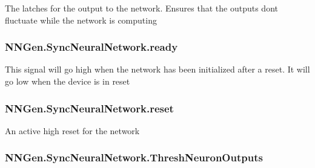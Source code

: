 The latches for the output to the network. Ensures that the outputs don\textquotesingle{}t fluctuate while the network is computing 

\hypertarget{class_n_n_gen_1_1_sync_neural_network_a6306a2d9e689ed32c74ccc5222284315}{}
\subsubsection[{ready}]{ N\+N\+Gen.\+Sync\+Neural\+Network.\+ready\hspace{0.3cm}{\ttfamily [get]}}\label{class_n_n_gen_1_1_sync_neural_network_a6306a2d9e689ed32c74ccc5222284315}


This signal will go high when the network has been initialized after a reset. It will go low when the device is in reset 

\hypertarget{class_n_n_gen_1_1_sync_neural_network_a6479fe503fb64dead6508c80c773b042}{}
\subsubsection[{reset}]{ N\+N\+Gen.\+Sync\+Neural\+Network.\+reset\hspace{0.3cm}{\ttfamily [get]}}\label{class_n_n_gen_1_1_sync_neural_network_a6479fe503fb64dead6508c80c773b042}


An active high reset for the network 

\hypertarget{class_n_n_gen_1_1_sync_neural_network_a6edeb1a10c731dbc74be6e227201deb0}{}
\subsubsection[{Thresh\+Neuron\+Outputs}]{ N\+N\+Gen.\+Sync\+Neural\+Network.\+Thresh\+Neuron\+Outputs\hspace{0.3cm}{\ttfamily [get]}}\label{class_n_n_gen_1_1_sync_neural_network_a6edeb1a10c731dbc74be6e227201deb0}


